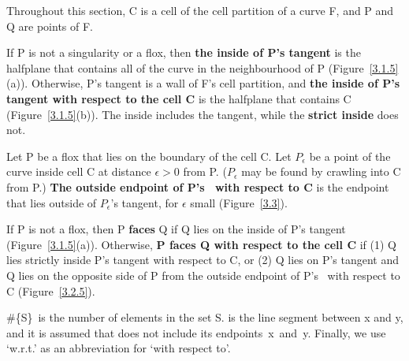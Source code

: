 Throughout this section, C is a cell of the cell partition of 
a curve F, and P and Q are points of F.
%
%
\begin{definition}
\label{defn-inside}
If P is not a singularity or a flox,
then {\bf the inside of P's tangent} is the halfplane that contains 
all of the curve in the neighbourhood of P (Figure~\ref{3.1.5}(a)).
Otherwise, P's tangent is a wall of F's cell partition, and
{\bf the inside of P's tangent with respect to the cell C} is the halfplane
that contains C (Figure~\ref{3.1.5}(b)).
The inside includes the tangent, while the {\bf strict inside} does not.

Let P be a flox that lies on the boundary of the cell C.
Let $P_{\epsilon}$ be a point of the curve inside cell C at distance
$\epsilon > 0$ from P.
($P_{\epsilon}$ may be found by crawling into C from P.)
{\bf The outside endpoint of P's \cellsegment\ with respect to C} is the 
endpoint that lies outside of $P_{\epsilon}$'s tangent, for $\epsilon$
small (Figure~\ref{3.3}).
%
%

If P is not a flox, then P {\bf faces} 
Q if Q lies on the inside of P's tangent (Figure~\ref{3.1.5}(a)).
Otherwise, {\bf P faces Q with respect to the cell C} if
(1) Q lies strictly inside P's tangent with respect to C,
or (2) Q lies on P's tangent and Q lies on the opposite side of P from 
the outside endpoint of P's \cellsegment\ with respect to C
(Figure~\ref{3.2.5}).
\end{definition}
%
%
%
\begin{notation}
\#\{S\}\ is the number of elements in the set S.
 is the line segment between x and y, 
and it is assumed that  does not include 
its \mbox{endpoints x and y}.
Finally, we use `w.r.t.' as an abbreviation for `with respect to'.
\end{notation}

